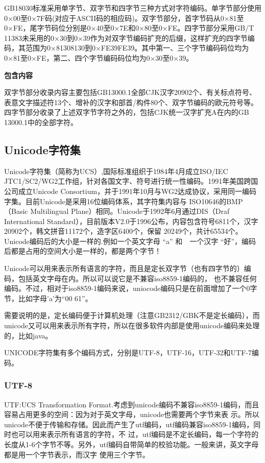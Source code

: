 \documentclass[doctor,openright,twoside]{sjtuthesis}
\theoremstyle{plain}
\theoremstyle{definition}
\theoremstyle{remark}
\theoremstyle{ocrenumbox}
\theoremstyle{plain}
\begin{document}
GB18030标准采用单字节、双字节和四字节三种方式对字符编码。单字节部分使用0×00至0×7F码(对应于ASCII码的相应码)。双字节部分，首字节码从0×81至0×FE，尾字节码位分别是0×40至0×7E和0×80至0×FE。四字节部分采用GB/T 11383未采用的0×30到0×39作为对双字节编码扩充的后缀，这样扩充的四字节编码，其范围为0×81308130到0×FE39FE39。其中第一、三个字节编码码位均为0×81至0×FE，第二、四个字节编码码位均为0×30至0×39。

\textbf{包含内容}

双字节部分收录内容主要包括GB13000.1全部CJK汉字20902个、有关标点符号、表意文字描述符13个、增补的汉字和部首/构件80个、双字节编码的欧元符号等。四字节部分收录了上述双字节字符之外的，包括CJK统一汉字扩充A在内的GB 13000.1中的全部字符。

\hypertarget{unicode}{%
\subsection{Unicode字符集}\label{unicode}}

Unicode字符集（简称为UCS）,国际标准组织于1984年4月成立ISO/IEC JTC1/SC2/WG2工作组，针对各国文字、符号进行统一性编码。1991年美国跨国公司成立Unicode Consortium，并于1991年10月与WG2达成协议，采用同一编码字集。目前Unicode是采用16位编码体系，其字符集内容与 ISO10646的BMP（Basic Multilingual Plane）相同。Unicode于1992年6月通过DIS（Draf International Standard），目前版本V2.0于1996公布，内容包含符号6811个，汉字20902个，韩文拼音11172个，造字区6400个，保留 20249个，共计65534个。Unicode编码后的大小是一样的.例如一个英文字母 ``a'' 和　一个汉字 ``好''，编码后都是占用的空间大小是一样的，都是两个字节！

Unicode可以用来表示所有语言的字符，而且是定长双字节（也有四字节的）编码，包括英文字母在内。所以可以说它是不兼容iso8859-1编码的， 也不兼容任何编码。不过，相对于iso8859-1编码来说，uniocode编码只是在前面增加了一个0字节，比如字母'a'为``00 61''。

需要说明的是，定长编码便于计算机处理（注意GB2312/GBK不是定长编码），而unicode又可以用来表示所有字符，所以在很多软件内部是使用unicode编码来处理的，比如java。

UNICODE字符集有多个编码方式，分别是UTF-8，UTF-16，UTF-32和UTF-7编码。

\hypertarget{utf-8}{%
\subsubsection{UTF-8}\label{utf-8}}

UTF:UCS Transformation Format.考虑到unicode编码不兼容iso8859-1编码，而且容易占用更多的空间：因为对于英文字母，unicode也需要两个字节来表 示。所以unicode不便于传输和存储。因此而产生了utf编码，utf编码兼容iso8859-1编码，同时也可以用来表示所有语言的字符，不 过，utf编码是不定长编码，每一个字符的长度从1-6个字节不等。另外，utf编码自带简单的校验功能。一般来讲，英文字母都是用一个字节表示，而汉字 使用三个字节。
\end{document}
